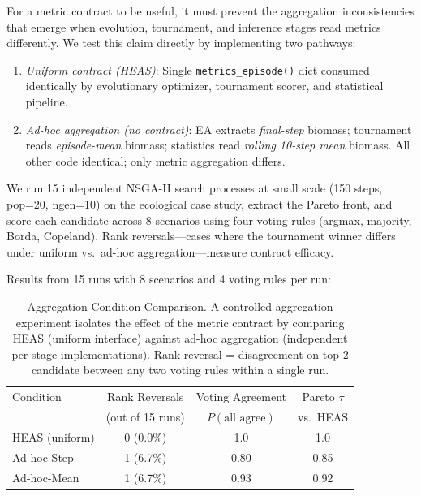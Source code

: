 \documentclass{wscpaperproc}
\begin{document}
For a metric contract to be useful, it must prevent the aggregation inconsistencies
that emerge when evolution, tournament, and inference stages read metrics differently.
We test this claim directly by implementing two pathways:

\begin{enumerate}
\item \emph{Uniform contract (HEAS)}: Single \texttt{metrics\_episode()} dict consumed
identically by evolutionary optimizer, tournament scorer, and statistical pipeline.
\item \emph{Ad-hoc aggregation (no contract)}: EA extracts \emph{final-step} biomass;
tournament reads \emph{episode-mean} biomass; statistics read \emph{rolling 10-step mean}
biomass. All other code identical; only metric aggregation differs.
\end{enumerate}

We run 15 independent NSGA-II search processes at small scale (150 steps, pop=20,
ngen=10) on the ecological case study, extract the Pareto front, and score each
candidate across 8 scenarios using four voting rules (argmax, majority, Borda,
Copeland). Rank reversals---cases where the tournament winner differs under uniform
vs.\ ad-hoc aggregation---measure contract efficacy.

Results from 15 runs with 8 scenarios and 4 voting rules per run:

\begin{table}[ht]
\centering\small
\caption{Aggregation Condition Comparison. A controlled aggregation experiment isolates
the effect of the metric contract by comparing HEAS (uniform interface) against ad-hoc
aggregation (independent per-stage implementations). Rank reversal = disagreement on
top-2 candidate between any two voting rules within a single run.}
\label{tab:agg-control}
\begin{tabular}{lccc}
\toprule
Condition & Rank Reversals & Voting Agreement & Pareto $\tau$ \\
& (out of 15 runs) & $P(\text{all agree})$ & vs.\ HEAS \\
\midrule
HEAS (uniform) & 0 (0.0\%) & 1.0 & 1.0 \\
Ad-hoc-Step & 1 (6.7\%) & 0.80 & 0.85 \\
Ad-hoc-Mean & 1 (6.7\%) & 0.93 & 0.92 \\
\bottomrule
\end{tabular}
\end{table}
\end{document}
